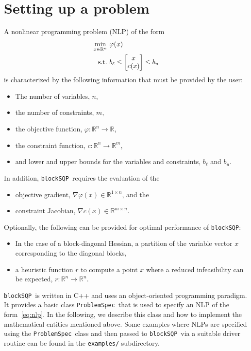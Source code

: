 \documentclass[	11pt,
				a4paper,
				abstract=true,
				twoside=true,
				bibliography=totoc, 
				headinclude=true,
				footinclude=false]{scrartcl}
\newcommand{\R}{\mathbb{R}}				%
\newcommand{\st}{\textup{s.t.}}
\newcommand{\blockSQP}{\texttt{blockSQP}}
\newcommand{\problem}{\texttt{ProblemSpec}}
\newcommand{\heu}{r}
\begin{document}
\section{Setting up a problem}
A nonlinear programming problem (NLP) of the form
\begin{subequations}\label{eq:nlp}
\begin{align}
\min_{x\in\R^{n}}\ &\varphi(x) \\
\st\ & b_{\ell} \leq \begin{bmatrix} x\\c(x)\end{bmatrix} \leq b_{u}
\end{align}
\end{subequations}
is characterized by the following information that must be provided by the user:
\begin{itemize}
\item The number of variables, $n$,
\item the number of constraints, $m$,
\item the objective function, $\varphi:\R^{n}\longrightarrow\R$,
\item the constraint function, $c:\R^{n}\longrightarrow\R^{m}$,
\item and lower and upper bounds for the variables and constraints, $b_{\ell}$ and $b_{u}$.
\end{itemize}
In addition, \blockSQP\ requires the evaluation of the
\begin{itemize}
\item objective gradient, $\nabla \varphi(x)\in\R^{1\times n}$, and the
\item constraint Jacobian, $\nabla c(x)\in\R^{m\times n}$.
\end{itemize}
Optionally, the following can be provided for optimal performance of \blockSQP:
\begin{itemize}
\item In the case of a block-diagonal Hessian, a partition of the variable vector $x$ corresponding to the diagonal blocks,
\item a heuristic function $r$ to compute a point $x$ where a reduced infeasibility can be expected, $\heu:\R^{n}\longrightarrow\R^{n}$.
\end{itemize}

\blockSQP\ is written in C++ and uses an object-oriented programming paradigm.
It provides a basic class \problem\ that is used to specify an NLP of the form~\eqref{eq:nlp}. In the following, we describe this class and how to implement the mathematical entities mentioned above. Some examples where NLPs are specified using the \problem\ class and then passed to \blockSQP\ via a suitable driver routine can be found in the \texttt{examples/} subdirectory.
\end{document}

